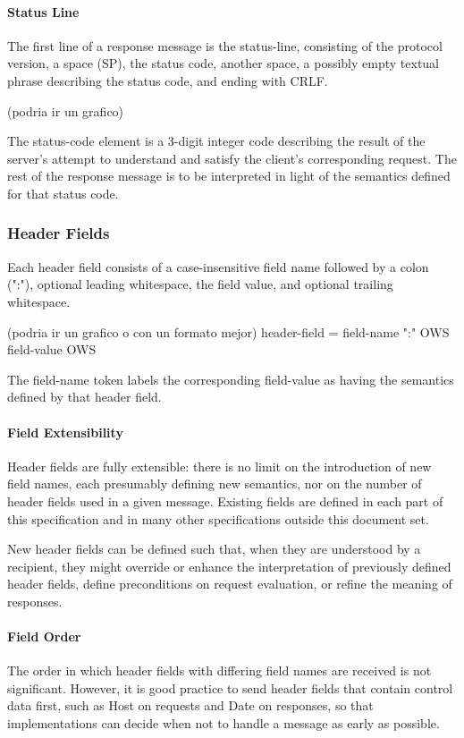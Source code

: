   
\paragraph*{Status Line}
The first line of a response message is the status-line, consisting
   of the protocol version, a space (SP), the status code, another
   space, a possibly empty textual phrase describing the status code,
   and ending with CRLF.

   (podria ir un grafico)

   The status-code element is a 3-digit integer code describing the
   result of the server's attempt to understand and satisfy the client's
   corresponding request.  The rest of the response message is to be
   interpreted in light of the semantics defined for that status code.
  


\subsubsection* {Header Fields}
Each header field consists of a case-insensitive field name followed
by a colon (":"), optional leading whitespace, the field value, and
optional trailing whitespace.

(podria ir un grafico o con un formato mejor)
header-field   = field-name ":" OWS field-value OWS

The field-name token labels the corresponding field-value as having
the semantics defined by that header field.  

\paragraph*{Field Extensibility}
Header fields are fully extensible: there is no limit on the
introduction of new field names, each presumably defining new
semantics, nor on the number of header fields used in a given
message.  Existing fields are defined in each part of this
specification and in many other specifications outside this document
set.

New header fields can be defined such that, when they are understood
by a recipient, they might override or enhance the interpretation of
previously defined header fields, define preconditions on request
evaluation, or refine the meaning of responses.

\paragraph*{Field Order}
The order in which header fields with differing field names are
   received is not significant.  However, it is good practice to send
   header fields that contain control data first, such as Host on
   requests and Date on responses, so that implementations can decide
   when not to handle a message as early as possible. 


